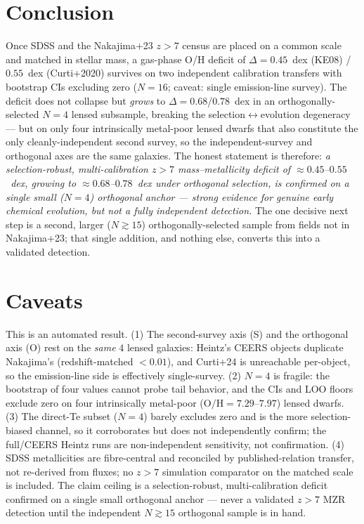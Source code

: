 \documentclass[twocolumn]{aastex631}
\begin{document}
\section{Conclusion}
Once SDSS and the Nakajima+23 $z>7$ census are placed on a common scale and matched in stellar mass, a gas-phase O/H deficit of $\Delta=0.45$~dex (KE08) / $0.55$~dex (Curti+2020) survives on two independent calibration transfers with bootstrap CIs excluding zero ($N=16$; caveat: single emission-line survey). The deficit does not collapse but \emph{grows} to $\Delta=0.68$/$0.78$~dex in an orthogonally-selected $N=4$ lensed subsample, breaking the selection$\leftrightarrow$evolution degeneracy --- but on only four intrinsically metal-poor lensed dwarfs that also constitute the only cleanly-independent second survey, so the independent-survey and orthogonal axes are the same galaxies. The honest statement is therefore: \emph{a selection-robust, multi-calibration $z>7$ mass--metallicity deficit of $\approx0.45$--$0.55$~dex, growing to $\approx0.68$--$0.78$~dex under orthogonal selection, is confirmed on a single small ($N=4$) orthogonal anchor --- strong evidence for genuine early chemical evolution, but not a fully independent detection.} The one decisive next step is a second, larger ($N\gtrsim15$) orthogonally-selected sample from fields not in Nakajima+23; that single addition, and nothing else, converts this into a validated detection.

\section{Caveats}
This is an automated result. (1) The second-survey axis (S) and the orthogonal axis (O) rest on the \emph{same} $4$ lensed galaxies: Heintz's CEERS objects duplicate Nakajima's (redshift-matched $<0.01$), and Curti+24 is unreachable per-object, so the emission-line side is effectively single-survey. (2) $N=4$ is fragile: the bootstrap of four values cannot probe tail behavior, and the CIs and LOO floors exclude zero on four intrinsically metal-poor ($\mathrm{O/H}=7.29$--$7.97$) lensed dwarfs. (3) The direct-Te subset ($N=4$) barely excludes zero and is the more selection-biased channel, so it corroborates but does not independently confirm; the full/CEERS Heintz runs are non-independent sensitivity, not confirmation. (4) SDSS metallicities are fibre-central and reconciled by published-relation transfer, not re-derived from fluxes; no $z>7$ simulation comparator on the matched scale is included. The claim ceiling is a selection-robust, multi-calibration deficit confirmed on a single small orthogonal anchor --- never a validated $z>7$ MZR detection until the independent $N\gtrsim15$ orthogonal sample is in hand.
\end{document}
